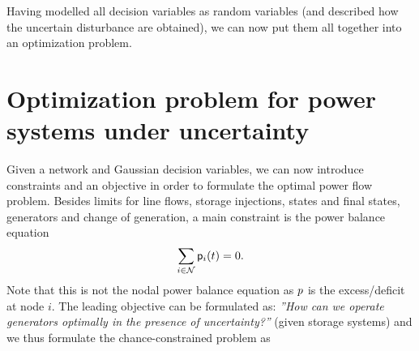 \documentclass[final,3p,times,twocolumn]{elsarticle}  %
\begin{document}
Having modelled all decision variables as random variables (and described how the uncertain disturbance are obtained), we can now put them all together into an optimization problem.
\vspace{1em}


\section{Optimization problem for power systems under uncertainty}
\label{sec:OPF}

Given a network and Gaussian decision variables, we can now introduce constraints and an objective in order to formulate the optimal power flow problem. Besides limits for line flows, storage injections, states and final states, generators and change of generation, a main constraint is the power balance equation
\begin{equation}
    \sum_{i \in \mathcal{N}} \mathsf{p}_i(t) = 0.
\end{equation}
Note that this is not the nodal power balance equation as $p$ is the excess/deficit at node $i$. 
The leading objective can be formulated as: \textit{''How can we operate generators optimally in the presence of uncertainty?''} (given storage systems) and we thus formulate the chance-constrained \opf problem as
\newcommand{\adjustCCOPF}{-10mm}
\end{document}
